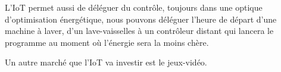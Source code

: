 L'IoT permet aussi de déléguer du contrôle, toujours dans une optique d'optimisation énergétique, nous pouvons déléguer l'heure de départ d'une machine à laver, d'un lave-vaisselles à un contrôleur distant qui lancera le programme au moment où l'énergie sera la moins chère.


Un autre marché que l'IoT va investir est le jeux-vidéo.



